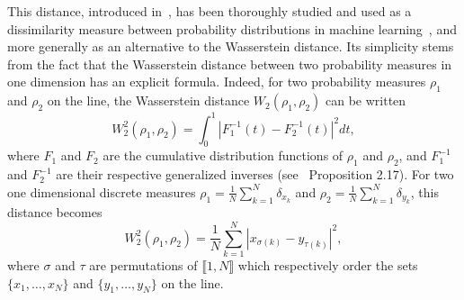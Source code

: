 This distance, introduced
in~\citep{Rabin_texture_mixing_sw},  has been thoroughly studied and
used as a dissimilarity measure between probability distributions in machine
learning~\citep{bonneel2015sliced,nadjahi2021sliced,kolouri2018slicedAE},
and more generally as an alternative to the Wasserstein distance. %
Its simplicity stems from the fact that the
Wasserstein distance between two probability measures in one dimension has
an explicit formula. Indeed, for two probability
measures $\rho_1$ and $\rho_2 $ on the line, the Wasserstein distance   $W_2(\rho_1,\rho_2)$ can be written
\begin{equation}
\label{eq:transport_ligne}
 W_2^2(\rho_1,\rho_2) =  \int_0^1 |F_1^{-1}(t)- F_2^{-1}(t)|^2dt,
\end{equation}
where  $F_1$ and $F_2$ are the cumulative distribution
functions of $\rho_1$ and $\rho_2 $, and $F_1^{-1}$ and $F_2^{-1}$ are
their respective
generalized inverses (see~\citep{santambrogio2015optimal} Proposition
2.17).  For two one dimensional discrete measures $\rho_1 =
\frac{1}{N}\sum\limits_{k=1}^N \delta_{x_k}$ and  $\rho_2 =
\frac{1}{N}\sum\limits_{k=1}^N \delta_{y_k}$, this distance becomes
\begin{equation}\label{eq:transport_ligne_2D_disc}
W_2^2(\rho_1,\rho_2) = \frac 1 N \sum_{k=1}^N |x_{\sigma(k)} -
y_{\tau(k)}|^2,
\end{equation}
where $\sigma$ and $\tau$ are permutations of
$\llbracket 1,N\rrbracket$ which respectively order the sets $ \{x_1,\dots,x_N\}$ and
$\{y_1,\dots,y_N\}$ on the line. 
